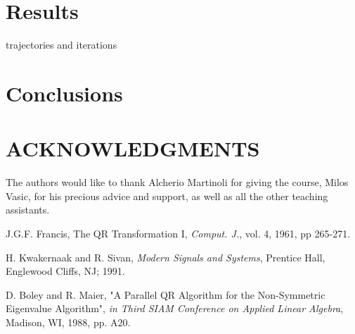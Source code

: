 \documentclass[a4, 10 pt, conference]{ieeeconf}  %
\begin{document}
\section{Results}
trajectories and iterations
\section{Conclusions}

\section{ACKNOWLEDGMENTS}
The authors would like to thank Alcherio Martinoli for giving the course, Milos Vasic, for his precious advice and support, as well as all the other teaching assistants.

\begin{thebibliography}{99}

J.G.F. Francis, The QR Transformation I, {\it Comput. J.}, vol. 4, 1961, pp 265-271.

H. Kwakernaak and R. Sivan, {\it Modern Signals and Systems}, Prentice Hall, Englewood Cliffs, NJ; 1991.

D. Boley and R. Maier, "A Parallel QR Algorithm for the Non-Symmetric Eigenvalue Algorithm", {\it in Third SIAM Conference on Applied Linear Algebra}, Madison, WI, 1988, pp. A20.

\end{thebibliography}
\end{document}
